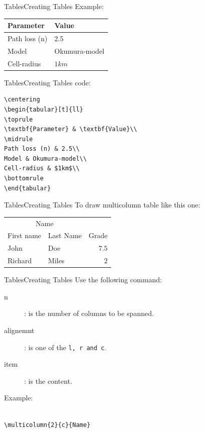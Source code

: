 \documentclass{bredelebeamer}
\begin{document}
\begin{frame}[fragile]{Tables}{Creating Tables}
\alert{Example:} 

\centering
\begin{tabular}[t]{ll}
\toprule
\textbf{Parameter} & \textbf{Value}\\
\midrule
Path loss (n) & 2.5\\
Model & Okumura-model\\
Cell-radius & $1km$\\
\bottomrule
\end{tabular}

\end{frame}

\begin{frame}[fragile]{Tables}{Creating Tables}
 code:\
\begin{verbatim}
\centering
\begin{tabular}[t]{ll}
\toprule
\textbf{Parameter} & \textbf{Value}\\
\midrule
Path loss (n) & 2.5\\
Model & Okumura-model\\
Cell-radius & $1km$\\
\bottomrule
\end{tabular}
\end{verbatim}
\end{frame}



\begin{frame}[fragile]{Tables}{Creating Tables}
To draw multicolumn table like this one:\\[0.5cm]
\begin{center}
\begin{tabular}{llr}
\toprule
\multicolumn{2}{c}{Name} \\
\cmidrule(lr){1-2}
First name	& Last Name	& Grade \\
\midrule
John 		    & Doe	  		& $7.5$ \\
Richard 	  & Miles		  & $2$ \\
\bottomrule
\end{tabular}
\end{center}
\end{frame}

\begin{frame}[fragile]{Tables}{Creating Tables}
Use the following command: \texttt{}
\begin{description}
\item [n]: is the number of columns to be spanned.
\item [alignemnt]: is one of the \texttt{l, r and c}.
\item [item]: is the content.
\end{description}
\alert{Example:}
\begin{verbatim}

\multicolumn{2}{c}{Name} 

\end{verbatim}

\end{frame}
\end{document}
